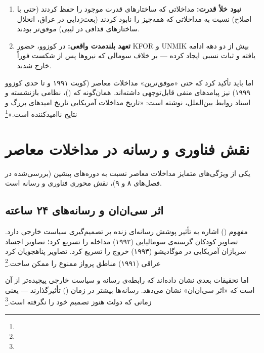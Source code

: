{\begin{tcolorbox}[successbox, title={عوامل نسبی «موفقیت» در مداخلات}]
\begin{enumerate}
\item \textbf{نبود خلأ قدرت:} مداخلاتی که ساختارهای قدرت موجود را حفظ کردند (حتی با اصلاح) نسبت به مداخلاتی که همه‌چیز را نابود کردند (بعث‌زدایی در عراق، انحلال ساختارهای قذافی در لیبی) موفق‌تر بودند.

\item \textbf{تعهد بلندمدت واقعی:} در کوزوو، حضور KFOR و UNMIK بیش از دو دهه ادامه یافته و ثبات نسبی ایجاد کرده — بر خلاف سومالی که نیروها پس از شکست فوراً خارج شدند.
\end{enumerate}
\end{tcolorbox}

اما باید تأکید کرد که حتی «موفق‌ترین» مداخلات معاصر (کویت ۱۹۹۱ و تا حدی کوزوو ۱۹۹۹) نیز پیامدهای منفی قابل‌توجهی داشته‌اند. همان‌گونه که  ()، نظامی بازنشسته و استاد روابط بین‌الملل، نوشته است: «تاریخ مداخلات آمریکایی تاریخ امیدهای بزرگ و نتایج ناامیدکننده است.»\footnote{}


\section{نقش فناوری و رسانه در مداخلات معاصر}
\label{sec:ch10-tech-media}

یکی از ویژگی‌های متمایز مداخلات معاصر نسبت به دوره‌های پیشین (بررسی‌شده در فصل‌های ۸ و ۹)، نقش محوری فناوری و رسانه است.

\subsection{اثر سی‌ان‌ان و رسانه‌های ۲۴ ساعته}
\label{subsec:ch10-cnn-effect}

مفهوم  () اشاره به تأثیر پوشش رسانه‌ای زنده بر تصمیم‌گیری سیاست خارجی دارد. تصاویر کودکان گرسنه‌ی سومالیایی (۱۹۹۲) مداخله را تسریع کرد؛ تصاویر اجساد سربازان آمریکایی در موگادیشو (۱۹۹۳) خروج را تسریع کرد. تصاویر پناهجویان کرد عراقی (۱۹۹۱) مناطق پرواز ممنوع را ممکن ساخت.\footnote{}

اما تحقیقات بعدی نشان داده‌اند که رابطه‌ی رسانه و سیاست خارجی پیچیده‌تر از آن است که «اثر سی‌ان‌ان» نشان می‌دهد. رسانه‌ها بیشتر در زمان  () تأثیرگذارند — یعنی زمانی که دولت هنوز تصمیم خود را نگرفته است.\footnote{}

}
